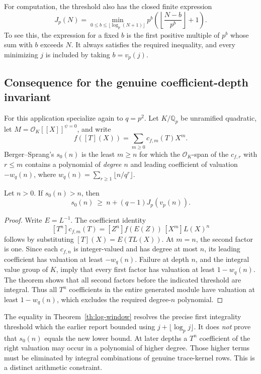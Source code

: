 For computation, the threshold also has the closed finite expression
\[
 J_p(N)=\min_{0\le b\le\lfloor\log_p(N+1)\rfloor}
 p^b\left(\left\lfloor\frac{N-b}{p^b}\right\rfloor+1\right).
\]
To see this, the expression for a fixed $b$ is the first positive multiple
of $p^b$ whose sum with $b$ exceeds $N$.  It always satisfies the required
inequality, and every minimizing $j$ is included by taking $b=v_p(j)$.

\subsection{Consequence for the genuine coefficient-depth invariant}
For this application specialize again to $q=p^2$.  Let $K/\mathbb Q_p$
be unramified quadratic, let
$M=\mathcal O_K[[X]]^{\psi=0}$, and write
\[
 f([T](X))=\sum_{m\ge0}c_{f,m}(T)X^m.
\]
Berger--Sprang's $s_0(n)$ is the least $m\ge n$ for which the
$\mathcal O_K$-span of the $c_{f,r}$ with $r\le m$ contains a polynomial of
\emph{degree $n$} and leading coefficient of valuation $-w_q(n)$, where
$w_q(n)=\sum_{r\ge1}\lfloor n/q^r\rfloor$.

\begin{corollary}\label{cor:depth-window}
Let $n>0$. If $s_0(n)>n$, then
\[
 s_0(n)\ \ge\ n+(q-1)J_p(v_p(n)).
\]
\end{corollary}
\begin{proof}
Write $E=L^{-1}$.  The coefficient identity
\[
 [T^n]c_{f,m}(T)=[Z^n]f(E(Z))\,[X^m]L(X)^n
\]
follows by substituting $[T](X)=E(TL(X))$.
At $m=n$, the second factor is one.  Since each $c_{f,n}$ is integer-valued
and has degree at most $n$, its leading coefficient has valuation at least
$-w_q(n)$.  Failure at depth $n$, and the integral value group of $K$, imply
that every first factor has valuation at least $1-w_q(n)$.  The theorem
shows that all second factors before the indicated threshold are integral.
Thus all $T^n$ coefficients in the entire generated module have valuation
at least $1-w_q(n)$, which excludes the required degree-$n$ polynomial.
\end{proof}

The equality in Theorem~\ref{th:log-window} resolves the precise first
integrality threshold which the earlier report bounded using
$j+\lfloor\log_pj\rfloor$.  It does \emph{not} prove that $s_0(n)$ equals the
new lower bound.  At later depths a $T^n$ coefficient of the right valuation
may occur in a polynomial of higher degree.  Those higher terms must be
eliminated by integral combinations of genuine trace-kernel rows.  This
is a distinct arithmetic constraint.

